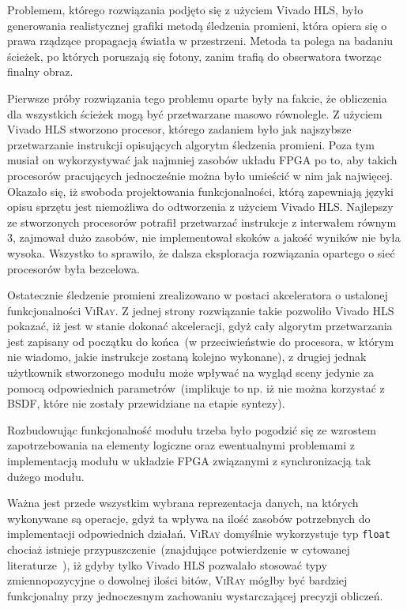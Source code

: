 Problemem, którego rozwiązania podjęto się z użyciem Vivado HLS, było generowania realistycznej grafiki metodą śledzenia promieni, która opiera się o prawa rządzące propagacją światła w przestrzeni. Metoda ta polega na badaniu ścieżek, po których poruszają się fotony, zanim trafią do obserwatora tworząc finalny obraz. 

Pierwsze próby rozwiązania tego problemu oparte były na fakcie, że obliczenia dla wszystkich ścieżek mogą być przetwarzane masowo równolegle. Z użyciem Vivado HLS stworzono procesor, którego zadaniem było jak najszybsze przetwarzanie instrukcji opisujących algorytm śledzenia promieni. Poza tym musiał on wykorzystywać jak najmniej zasobów układu FPGA po to, aby takich procesorów pracujących jednocześnie można było umieścić w nim jak najwięcej. Okazało się, iż swoboda projektowania funkcjonalności, którą zapewniają języki opisu sprzętu jest niemożliwa do odtworzenia z użyciem Vivado HLS. Najlepszy ze stworzonych procesorów potrafił przetwarzać instrukcje z interwałem równym 3, zajmował dużo zasobów, nie implementował skoków a jakość wyników nie była wysoka. Wszystko to sprawiło, że dalsza eksploracja rozwiązania opartego o sieć procesorów była bezcelowa.

Ostatecznie śledzenie promieni zrealizowano w postaci akceleratora o ustalonej funkcjonalności \textsc{ViRay}. Z jednej strony rozwiązanie takie pozwoliło Vivado HLS pokazać, iż jest w stanie dokonać akceleracji, gdyż cały algorytm przetwarzania jest zapisany od początku do końca~(w przeciwieństwie do procesora, w którym nie wiadomo, jakie instrukcje zostaną kolejno wykonane), z drugiej jednak użytkownik stworzonego modułu może wpływać na wygląd sceny jedynie za pomocą odpowiednich parametrów~(implikuje to np. iż nie można korzystać z BSDF, które nie zostały przewidziane na etapie syntezy). 

Rozbudowując funkcjonalność modułu trzeba było pogodzić się ze wzrostem zapotrzebowania na elementy logiczne oraz ewentualnymi problemami z implementacją modułu w układzie FPGA związanymi z synchronizacją tak dużego modułu. 

Ważna jest przede wszystkim wybrana reprezentacja danych, na których wykonywane są operacje, gdyż ta wpływa na ilość zasobów potrzebnych do implementacji odpowiednich działań. \textsc{ViRay} domyślnie wykorzystuje typ \texttt{float} chociaż istnieje przypuszczenie~(znajdujące potwierdzenie w cytowanej literaturze~\cite{RPU}), iż gdyby tylko Vivado HLS pozwalało stosować typy zmiennopozycyjne o dowolnej ilości bitów, \textsc{ViRay} mógłby być bardziej funkcjonalny przy jednoczesnym zachowaniu wystarczającej precyzji obliczeń.

